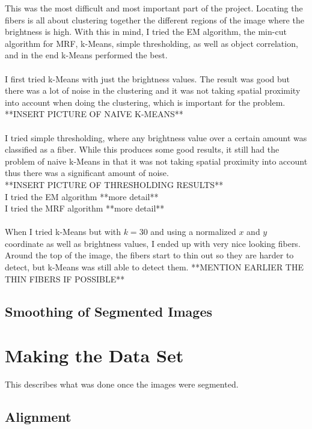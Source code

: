 \documentclass[11pt,psfig]{article}
\begin{document}
This was the most difficult and most important part of the project. Locating the fibers is all about clustering together the different regions of the image where the brightness is high. With this in mind, I tried the EM algorithm, the min-cut algorithm for MRF, k-Means, simple thresholding, as well as object correlation, and in the end k-Means performed the best. \\
\\
I first tried k-Means with just the brightness values. The result was good but there was a lot of noise in the clustering and it was not taking spatial proximity into account when doing the clustering, which is important for the problem. \\
**INSERT PICTURE OF NAIVE K-MEANS**\\
\\
I tried simple thresholding, where any brightness value over a certain amount was classified as a fiber. While this produces some good results, it still had the problem of naive k-Means in that it was not taking spatial proximity into account thus there was a significant amount of noise. \\
**INSERT PICTURE OF THRESHOLDING RESULTS**\\
I tried the EM algorithm **more detail**\\
I tried the MRF algorithm **more detail**\\
\\
When I tried k-Means but with $k=30$ and using a normalized $x$ and $y$ coordinate as well as brightness values, I ended up with very nice looking fibers. Around the top of the image, the fibers start to thin out so they are harder to detect, but k-Means was still able to detect them. **MENTION EARLIER THE THIN FIBERS IF POSSIBLE**

\subsection*{Smoothing of Segmented Images}

\section*{Making the Data Set}

This describes what was done once the images were segmented. 

\subsection*{Alignment}
\end{document}

